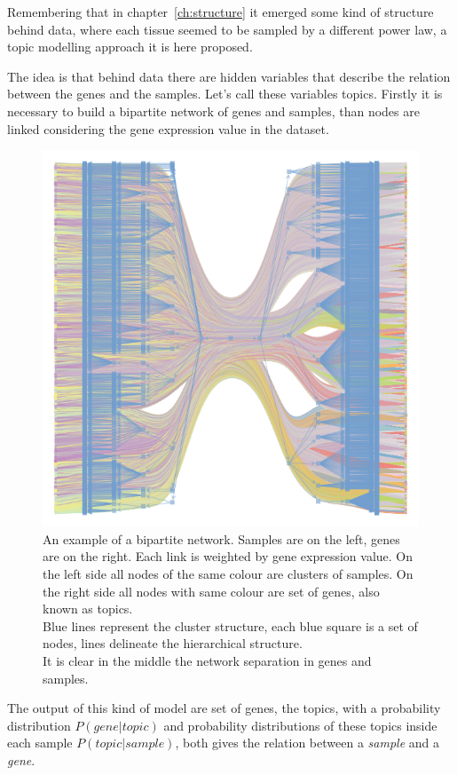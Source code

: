 Remembering that in chapter~\ref{ch:structure} it emerged some kind of structure behind data, where each tissue seemed to be sampled by a different power law, a topic modelling approach it is here proposed.

The idea is that behind data there are hidden variables that describe the relation between the genes and the samples. Let's call these variables topics.
Firstly it is necessary to build a bipartite network of genes and samples, than nodes are linked considering the gene expression value in the dataset.
\begin{figure}[htb!]
    \centering
    \includegraphics[width=0.7\linewidth]{pictures/topic/bipartite.pdf}
    \caption{An example of a bipartite network. Samples are on the left, genes are on the right. Each link is weighted by gene expression value. On the left side all nodes of the same colour are clusters of samples. On the right side all nodes with same colour are set of genes, also known as topics.\\ 
    Blue lines represent the cluster structure, each blue square is a set of nodes, lines delineate the hierarchical structure.\\
    It is clear in the middle the network separation in genes and samples.}
    \label{fig:topic/bipartite}
\end{figure}

The output of this kind of model are set of genes, the topics, with a probability distribution $P(gene | topic)$ and probability distributions of these topics inside each sample $P(topic | sample)$, both gives the relation between a \textit{sample} and a \textit{gene}.

